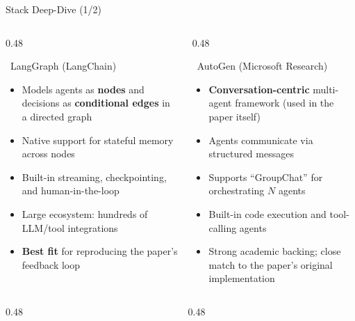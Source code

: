 \documentclass[aspectratio=169]{beamer}
\begin{document}
\begin{frame}{Stack Deep-Dive (1/2)}
  \begin{columns}[T]
    \begin{column}{0.48\textwidth}
      \begin{exampleblock}{\faProjectDiagram\ LangGraph (LangChain)}
        \small
        \begin{itemize}
          \item Models agents as \textbf{nodes} and decisions as \textbf{conditional edges} in a directed graph
          \item Native support for stateful memory across nodes
          \item Built-in streaming, checkpointing, and human-in-the-loop
          \item Large ecosystem: hundreds of LLM/tool integrations
          \item \textbf{Best fit} for reproducing the paper's feedback loop
        \end{itemize}
      \end{exampleblock}
    \end{column}
    \begin{column}{0.48\textwidth}
      \begin{exampleblock}{\faRobot\ AutoGen (Microsoft Research)}
        \small
        \begin{itemize}
          \item \textbf{Conversation-centric} multi-agent framework (used in the paper itself)
          \item Agents communicate via structured messages
          \item Supports ``GroupChat'' for orchestrating $N$ agents
          \item Built-in code execution and tool-calling agents
          \item Strong academic backing; close match to the paper's original implementation
        \end{itemize}
      \end{exampleblock}
    \end{column}
  \end{columns}
  \vspace{0.3cm}
  \begin{columns}[T]
    \begin{column}{0.48\textwidth}
      
     
    \end{column}
    \begin{column}{0.48\textwidth}
      
    \end{column}
  \end{columns}
\end{frame}
\end{document}
